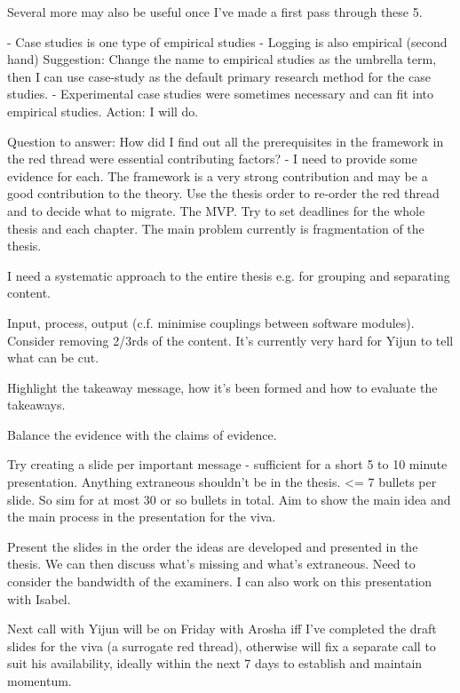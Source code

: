 Several more may also be useful once I've made a first pass through these 5.

- Case studies is one type of empirical studies
- Logging is also empirical (second hand) 
Suggestion: Change the name to empirical studies as the umbrella term, then I can use case-study as the default primary research method for the case studies.
- Experimental case studies were sometimes necessary and can fit into empirical studies. 
Action: I will do.

Question to answer: How did I find out all the prerequisites in the framework in the red thread were essential contributing factors? - I need to provide some evidence for each.
The framework is a very strong contribution and may be a good contribution to the theory. 
Use the thesis order to re-order the red thread and to decide what to migrate. The MVP. Try to set deadlines for the whole thesis and each chapter. The main problem currently is fragmentation of the thesis.

I need a systematic approach to the entire thesis e.g. for grouping and separating content. 

Input, process, output (c.f. minimise couplings between software modules).
Consider removing 2/3rds of the content. It's currently very hard for Yijun to tell what can be cut.

Highlight the takeaway message, how it's been formed and how to evaluate the takeaways.

Balance the evidence with the claims of evidence.

Try creating a slide per important message - sufficient for a short 5 to 10 minute presentation. Anything extraneous shouldn't be in the thesis. <= 7 bullets per slide. So sim for at most 30 or so bullets in total. Aim to show the main idea and the main process in the presentation for the viva.

Present the slides in the order the ideas are developed and presented in the thesis. We can then discuss what's missing and what's extraneous. Need to consider the bandwidth of the examiners. I can also work on this presentation with Isabel. 

Next call with Yijun will be on Friday with Arosha iff I've completed the draft slides for the viva (a surrogate red thread), otherwise will fix a separate call to suit his availability, ideally within the next 7 days to establish and maintain momentum.
\hfillrule